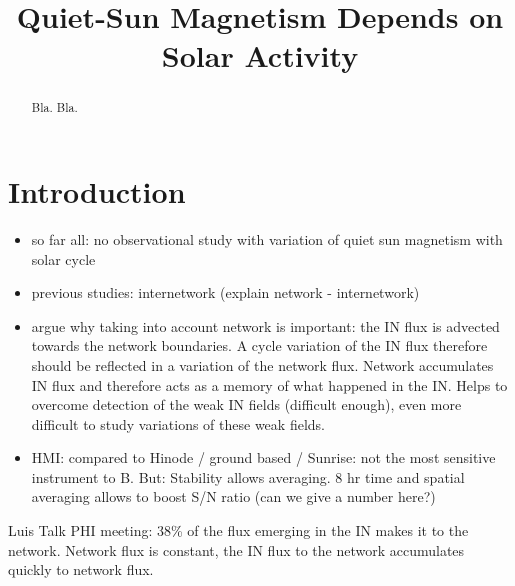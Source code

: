 \documentclass[twocolumn,linenumbers,trackchanges]{aastex631}
\begin{document}
\title{Quiet-Sun Magnetism Depends on Solar Activity}



\begin{abstract}

Bla. Bla.

\end{abstract}


\section{Introduction} \label{sec:intro}

\begin{itemize}
\item so far all: no observational study with variation of quiet sun magnetism with solar cycle
\item previous studies: internetwork (explain network - internetwork)
\item argue why taking into account network is important: the IN flux is advected towards the network boundaries. A cycle variation of the IN flux therefore should be reflected in a variation of the network flux. Network accumulates IN flux and therefore acts as a memory of what happened in the IN. Helps to overcome detection of the weak IN fields (difficult enough), even more difficult to study variations of these weak fields.
\item HMI: compared to Hinode / ground based / Sunrise: not the most sensitive instrument to B. But: Stability allows averaging. 8 hr time and spatial averaging allows to boost S/N ratio (can we give a number here?)

\end{itemize}

\cite[]{2019LRSP...16....1B}
Luis Talk PHI meeting: 38\% of the flux emerging in the IN makes it to the network. Network flux is constant, the IN flux to the network accumulates quickly to network flux.

\cite[]{2015ApJ...806..174J}
\end{document}
